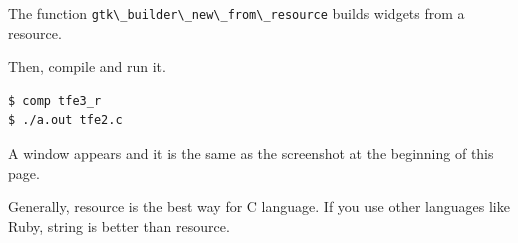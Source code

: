 The function \passthrough{\lstinline!gtk\_builder\_new\_from\_resource!}
builds widgets from a resource.

Then, compile and run it.

\begin{lstlisting}
$ comp tfe3_r
$ ./a.out tfe2.c
\end{lstlisting}

A window appears and it is the same as the screenshot at the beginning
of this page.

Generally, resource is the best way for C language. If you use other
languages like Ruby, string is better than resource.
